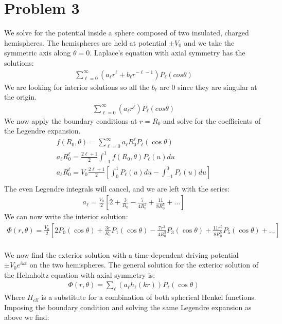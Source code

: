 \documentclass[a4paper,12pt]{article}
\numberwithin{equation}{section}
\begin{document}
\section{Problem 3}
We solve for the potential inside a sphere composed of two insulated, charged hemispheres.
The hemispheres are held at potential $\pm V_0$ and we take the symmetric axis along $\theta=0$.
Laplace's equation with axial symmetry has the solutions:
\begin{gather}
 \sum_{\ell=0}^{\infty}(a_\ell r^\ell+b_\ell r^{-\ell-1} )P_\ell(cos \theta)
\end{gather}
We are looking for interior solutions so all the $b_\ell$ are 0 since they are singular at the origin.
\begin{gather}
 \sum_{\ell=0}^{\infty}(a_\ell r^\ell )P_\ell(cos \theta)
\end{gather}
We now apply the boundary conditions at $r=R_0$ and solve for the coefficients of the Legendre expansion.
\begin{gather}
 f(R_0,\theta)=\sum_{\ell=0}^{\infty}a_\ell R_0^{\ell}P_\ell(\cos \theta)\\
 a_\ell R_0^\ell=\frac{2\ell + 1}{2}\int_{-1}^{1}f(R_0,\theta)P_\ell(u) du\\
  a_\ell R_0^\ell=V_0\frac{2\ell + 1}{2}[\int_{0}^{1} P_\ell(u) du- \int_{-1}^{0} P_\ell(u) du ]\\
\end{gather}
The even Legendre integrals will cancel, and we are left with the series:
\begin{gather}
 a_\ell=\frac{V_0}{2}[2+\frac{3}{R_0}-\frac{7}{4R_0^3}+\frac{11}{8R_0^5}+\ldots]
\end{gather}
We can now write the interior solution:
\begin{gather}
 \Phi(r,\theta)=\frac{V_0}{2}[2P_0(\cos \theta)+\frac{3r}{R_0}P_1(\cos \theta)-\frac{7r^3}{4R_0^3}P_3(\cos \theta)+\frac{11r^5}{8R_0^5}P_5(\cos \theta)+\ldots]
\end{gather}
\\
We now find the exterior solution with a time-dependent driving potential $\pm V_0e^{i\omega t}$ on the two hemispheres.
The general solution for the exterior solution of the Helmholtz equation with axial symmetry is:
\begin{gather}
 \Phi(r,\theta)=\sum_{\ell}(a_{\ell}h_{\ell}(kr))P_{\ell}(\cos \theta)
\end{gather}
Where $H_{ell}$ is a substitute for a combination of both spherical Henkel functions.
Imposing the boundary condition and solving the same Legendre expansion as above we find:
\end{document}
